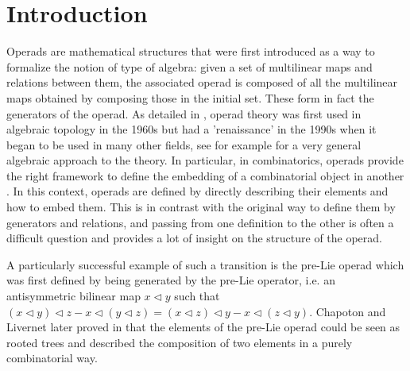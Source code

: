 \section*{Introduction}

Operads are mathematical structures that were first introduced as a way to formalize the 
notion of type of algebra: given a set of multilinear maps and relations between them,
the associated operad is composed of all the multilinear maps obtained by composing those in the
initial set.
These form in fact the generators of the operad. As detailed in \cite{MSJ02}, operad theory was first 
used in algebraic topology in the 1960s but had a 'renaissance' in the 1990s when it began to be used 
in many other fields, see for example \cite{LV12} for a very general algebraic approach to the theory. 
In particular, in combinatorics, operads provide the right framework to define the embedding of a 
combinatorial object in another \cite{CSLC, Gir18}. In this context, operads are defined by directly 
describing their elements and how to embed them. This is in contrast with the original way to define
them by generators and relations, and passing from one definition to the other is often a difficult
question and provides a lot of insight on the structure of the operad. 

A particularly successful example of such a transition is the pre-Lie operad which was first defined by 
being generated by the pre-Lie operator, i.e. an antisymmetric bilinear map $x\vartriangleleft y$ such that 
$(x\vartriangleleft y)\vartriangleleft z -x \vartriangleleft(y\vartriangleleft z) = (x\vartriangleleft z)\vartriangleleft y - x\vartriangleleft(z\vartriangleleft y)$.
Chapoton and Livernet later proved in \cite{CL01} that the elements of the pre-Lie operad could be seen 
as rooted trees and described the composition of two elements in a purely combinatorial way.

